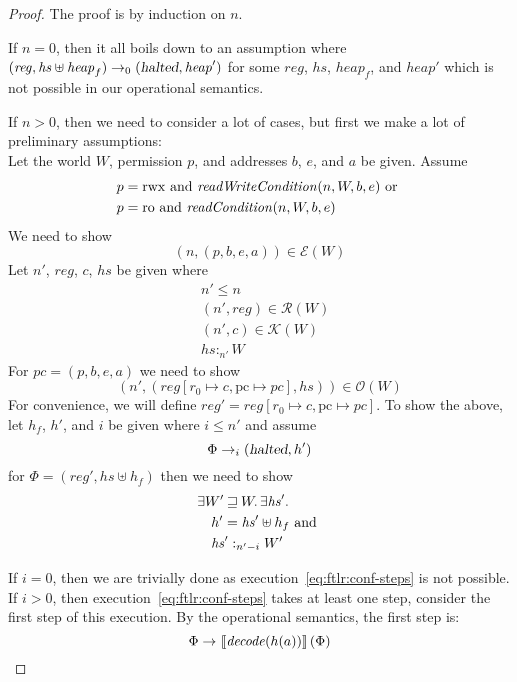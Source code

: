 \documentclass{article}
\newcommand{\sem}[1]{\left\llbracket #1 \right\rrbracket}
\newcommand{\var}[1]{\mathit{#1}}
\newcommand{\hs}{\var{hs}}
\newcommand{\pc}{\mathit{pc}}
\newcommand{\pcreg}{\mathrm{pc}}
\newcommand{\reg}{\var{reg}}
\newcommand{\heap}{\var{heap}}
\newcommand{\halted}{\textsl{halted}}
\newcommand{\plainfun}[2]{
  \ifthenelse{\equal{#2}{}}
             {\mathit{#1}}
             {\mathit{#1}(#2)}
}
\newcommand{\decode}{\plainfun{decode}{}}
\newcommand{\readCond}[1]{\plainfun{readCondition}{#1}}
\newcommand{\writeCond}[1]{\plainfun{readWriteCondition}{#1}}
\newcommand{\future}{\mathbin{\sqsupseteq}}
\newcommand{\heapSat}[3][\heap]{#1 :_{#2} #3}
\newcommand{\asmType}{\plaindom{AsmType}}
\newcommand{\plaindom}[1]{\mathrm{#1}}
\newcommand{\intr}[2]{\mathcal{#1}}
\newcommand{\exprintr}[1]{\intr{E}{#1}}
\newcommand{\contintr}[1]{\intr{K}{#1}}
\newcommand{\regintr}[1]{\intr{R}{#1}}
\newcommand{\stder}{\exprintr{\asmType}}
\newcommand{\stdrr}{\regintr{\asmType}}
\newcommand{\stdkr}{\contintr{\asmType}}
\newcommand{\observations}{\mathcal{O}}
\newcommand{\npair}[2][n]{\left(#1,#2 \right)}
\newcommand{\plainperm}[1]{\mathrm{#1}}
\newcommand{\readonly}{\plainperm{ro}}
\newcommand{\rwx}{\plainperm{rwx}}
\newcommand{\step}[1][]{\rightarrow_{#1}}
\begin{document}
\begin{proof}
  The proof is by induction on $n$.

If $n=0$, then it all boils down to an assumption where $(\reg, \hs \uplus \heap_f) \step[0] (\halted, \heap')$ for some $\reg$, $\hs$, $\heap_f$, and $\heap'$ which is not possible in our operational semantics.

If $n > 0$, then we need to consider a lot of cases, but first we make a lot of preliminary assumptions:\\
Let the world $W$, permission $p$, and addresses $b$, $e$, and $a$ be given. Assume
\begin{align}
  & p = \rwx \text{ and } \writeCond{n,W,b,e} \text{ or } \label{eq:ftlr:rwx-assump}\\
  & p = \readonly \text{ and } \readCond{n,W,b,e} \label{eq:ftlr:rx-assump}
\end{align}
We need to show 
\[
  \npair{(p,b,e,a)} \in \stder(W)
\]
Let $n'$, $\reg$, $c$, $\hs$ be given where
\begin{align}
  & n' \leq n \label{eq:ftlr:n-leq} \\
  & \npair[n']{\reg} \in \stdrr(W) \label{eq:ftlr:reg-in-stdrr}\\
  & \npair[n']{c} \in \stdkr(W) \label{eq:ftlr:cont-in-stdkr}\\
  & \heapSat[\hs]{n'}{W} \label{eq:ftlr:hs-heapsat}
\end{align}
For $\pc = (p,b,e,a)$ we need to show
\[
\npair[n']{(\reg[r_0 \mapsto c, \pcreg \mapsto \pc],\hs)} \in \observations(W)
\]
For convenience, we will define $\reg' = \reg[r_0 \mapsto c, \pcreg \mapsto \pc]$. To show the above, let $h_f$, $h'$, and $i$ be given where $i \leq n'$ and assume
\begin{equation}
  \label{eq:ftlr:conf-steps}
  \Phi \step[i] (\halted, h')
\end{equation}
for $\Phi = (\reg',\hs \uplus h_f)$ then we need to show
\begin{align}
  & \exists W' \future W \ldotp \exists \hs' \ldotp \nonumber \\
  & \quad h' =  \hs' \uplus h_f \text{ and } \label{eq:ftlr:final-heap-cond} \\
  & \quad \heapSat[\hs']{n'-i}{W'} \label{eq:ftlr:heap-sat-cond}
\end{align}

If $i=0$, then we are trivially done as execution~\ref{eq:ftlr:conf-steps} is not possible. If $i>0$, then execution~\ref{eq:ftlr:conf-steps} takes at least one step, consider the first step of this execution. By the operational semantics, the first step is:
\begin{equation*}
  \Phi \step \sem{\decode(h(a))}(\Phi)
\end{equation*}


\end{proof}
\end{document}
